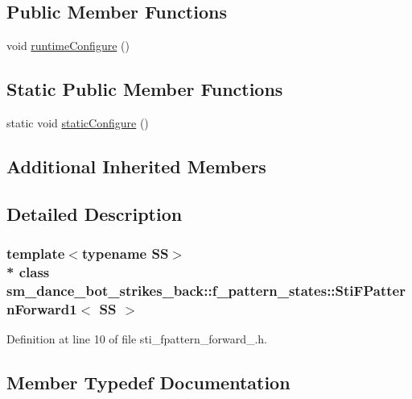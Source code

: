 \subsection*{Public Member Functions}
\begin{DoxyCompactItemize}
\item 
void \hyperlink{structsm__dance__bot__strikes__back_1_1f__pattern__states_1_1StiFPatternForward1_ae0e8a1296eb9d7be70833fa4a7783042}{runtime\+Configure} ()
\end{DoxyCompactItemize}
\subsection*{Static Public Member Functions}
\begin{DoxyCompactItemize}
\item 
static void \hyperlink{structsm__dance__bot__strikes__back_1_1f__pattern__states_1_1StiFPatternForward1_a49f96e0183e05bf9c7ae44535bb2f2fb}{static\+Configure} ()
\end{DoxyCompactItemize}
\subsection*{Additional Inherited Members}


\subsection{Detailed Description}
\subsubsection*{template$<$typename SS$>$\\*
class sm\+\_\+dance\+\_\+bot\+\_\+strikes\+\_\+back\+::f\+\_\+pattern\+\_\+states\+::\+Sti\+F\+Pattern\+Forward1$<$ S\+S $>$}



Definition at line 10 of file sti\+\_\+fpattern\+\_\+forward\+\_.\+h.



\subsection{Member Typedef Documentation}
